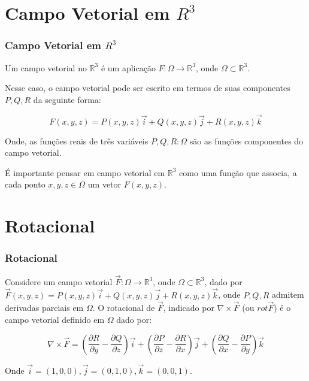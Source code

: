 \section{Campo Vetorial em $R^3$}
\begin{frame}
    \frametitle{Campo Vetorial em $R^3$}
    \begin{mydef}
        Um campo vetorial no $\mathbb{R}^3$ é um aplicação $F: \Omega \rightarrow \mathbb{R}^3$, onde $\Omega \subset \mathbb{R}^3$.
    \end{mydef}
    \vspace{3mm}
    
    Nesse caso, o campo vetorial pode ser escrito em termos de suas componentes $P, Q, R$ da seguinte forma:
    
    \begin{equation*}
        F(x, y, z) = P(x, y, z) \vec{i} + Q(x, y, z) \vec{j} + R(x, y, z) \vec{k}
    \end{equation*}
    
    Onde, as funções reais de três variáveis $P, Q, R: \Omega$ são as funções componentes do campo vetorial.
    \vspace{3mm}
    
    É importante pensar em campo vetorial em $\mathbb{R}^3$ como uma função que associa, a cada ponto $x, y, z \in \Omega$ um vetor $F(x, y, z)$.
\end{frame}

\section{Rotacional}
\begin{frame}
    \frametitle{Rotacional}
    \begin{mydef}
        \justifying
        Considere um campo vetorial $\vec{F}: \Omega \rightarrow \mathbb{R}^3$, onde $\Omega \subset \mathbb{R}^3$, dado por $\vec{F}(x, y, z) = P(x, y, z)\vec{i} + Q(x, y, z)\vec{j} + R(x, y, z)\vec{k}$, onde $P, Q, R$ admitem derivadas parciais em $\Omega$. O rotacional de $\vec{F}$, indicado por $\nabla \times \vec{F}$ (ou $rot \vec{F}$) é o campo vetorial definido em $\Omega$ dado por:
    \end{mydef}
    
    \begin{equation*}
        \nabla \times \vec{F} = \left(
        \frac{\partial R}{\partial y} - \frac{\partial Q}{\partial z}
        \right)\vec{i} + \left(
        \frac{\partial P}{\partial z} - \frac{\partial R}{\partial x}
        \right)\vec{j} + \left(
        \frac{\partial Q}{\partial x} - \frac{\partial P}{\partial y}
        \right)\vec{k}
    \end{equation*}
    \vspace{3mm}
    
    Onde $\vec{i} = (1, 0, 0), \vec{j} = (0, 1, 0), \vec{k} = (0, 0, 1)$.
    
\end{frame}

